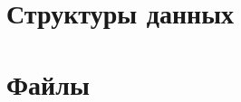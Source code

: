 \documentclass[twoside]{book}
\newcommand{\+}{\discretionary{\mbox{\scriptsize$\hookleftarrow$}}{}{}}
\newcommand{\clearemptydoublepage}{%
    \newpage{\pagestyle{empty}\cleardoublepage}%
  }
\begin{document}
\chapter{Структуры данных}







\chapter{Файлы}






  \backmatter
  \newpage
  \clearemptydoublepage
  \printindex
\end{document}

